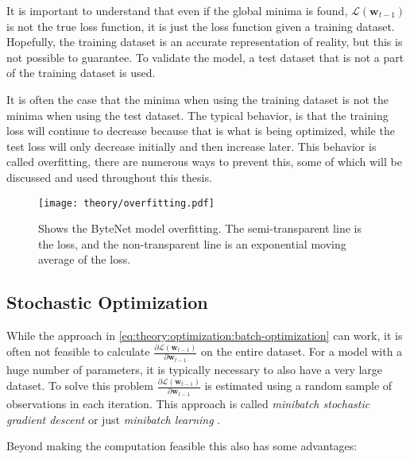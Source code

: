 It is important to understand that even if the global minima is found, $\mathcal{L}(\mathbf{w}_{t-1})$ is not the true loss function, it is just the loss function given a training dataset. Hopefully, the training dataset is an accurate representation of reality, but this is not possible to guarantee. To validate the model, a test dataset that is not a part of the training dataset is used.

It is often the case that the minima when using the training dataset is not the minima when using the test dataset. The typical behavior, is that the training loss will continue to decrease because that is what is being optimized, while the test loss will only decrease initially and then increase later. This behavior is called overfitting, there are numerous ways to prevent this, some of which will be discussed and used throughout this thesis.

\begin{figure}[h]
    \centering
    \texttt{[image: theory/overfitting.pdf]}
    \caption{Shows the ByteNet model overfitting. The semi-transparent line is the loss, and the non-transparent line is an exponential moving average of the loss.}
\end{figure}

\subsection{Stochastic Optimization}

While the approach in \eqref{eq:theory:optimization:batch-optimization} can work, it is often not feasible to calculate $\frac{\partial \mathcal{L}(\mathbf{w}_{t-1})}{\partial \mathbf{w}_{t-1}}$ on the entire dataset. For a model with a huge number of parameters, it is typically necessary to also have a very large dataset. To solve this problem $\frac{\partial \mathcal{L}(\mathbf{w}_{t-1})}{\partial \mathbf{w}_{t-1}}$ is estimated using a random sample of observations in each iteration. This approach is called \textit{minibatch stochastic gradient descent} or just \textit{minibatch learning} \cite{deep-learning}.

Beyond making the computation feasible this also has some advantages:

